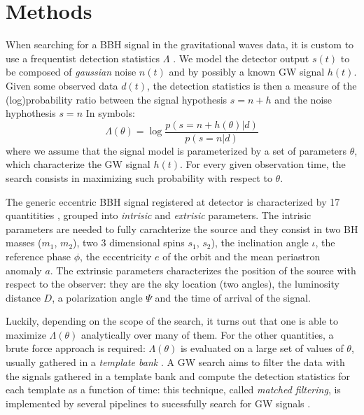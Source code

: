 \documentclass[twocolumn,showpacs,preprintnumbers,nofootinbib,prd,
superscriptaddress,10pt]{revtex4-2}
\begin{document}
\section{Methods} \label{sec:methods}

When searching for a BBH signal in the gravitational waves data, it is custom to use a frequentist detection statistics $\Lambda$ \cite{Creighton_book, PhysRevD.94.024012}.
We model the detector output $s(t)$ to be composed of {\it gaussian} noise $n(t)$ and by possibly a known GW signal $h(t)$.
Given some observed data $d(t)$, the detection statistics is then a measure of the (log)probability ratio between the signal hypothesis $s = n+h$ and the noise hyphothesis $s = n$
In symbols:
\begin{equation}\label{eq:LL}
	\Lambda(\theta) = \log\frac{p(s = n+h(\theta)|d)}{p(s = n|d)}
\end{equation}
where we assume that the signal model is parameterized by a set of parameters $\theta$, which characterize the GW signal $h(t)$.
For every given observation time, the search consists in maximizing such probability with respect to $\theta$. 

The generic eccentric BBH signal registered at detector is characterized by 17 quantitities \cite{Sathyaprakash_2009}, grouped into \textit{intrisic} and \textit{extrisic} parameters.
The intrisic parameters are needed to fully carachterize the source and they consist in two BH masses ($m_1$, $m_2$), two 3 dimensional spins $s_1$, $s_2$), the inclination angle $\iota$, the reference phase $\phi$, the eccentricity $e$ of the orbit and the mean periastron anomaly $a$.
The extrinsic parameters characterizes the position of the source with respect to the observer: they are the sky location (two angles), the luminosity distance $D$, a polarization angle $\Psi$ and the time of arrival of the signal.

Luckily, depending on the scope of the search, it turns out that one is able to maximize $\Lambda(\theta)$ analytically over many of them. For the other quantities, a brute force approach is required: $\Lambda(\theta)$ is evaluated on a large set of values of $\theta$, usually gathered in a {\it template bank} \cite{PhysRevD.77.104017, Mukherjee_2021}. 
A GW search aims to filter the data with the signals gathered in a template bank and compute the detection statistics for each template as a function of time: this technique, called {\it matched filtering}, is implemented by several pipelines to sucessfully search for GW signals \cite{Usman:2015kfa,PhysRevD.95.042001,gstlal_paper2, Aubin:2020goo, Chu:2020pjv}.
\end{document}
